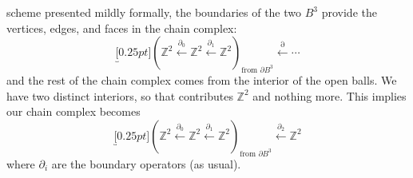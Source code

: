 scheme presented mildly formally, the boundaries of the two
$B^{3}$ provide the vertices, edges, and faces in the chain
complex:
\begin{equation}%
\underbracket[0.25pt]{\left(\mathbb{Z}^{2}\xleftarrow{\partial_{0}}\mathbb{Z}^{2}\xleftarrow{\partial_{1}}\mathbb{Z}^{2}\right)}_{\text{from $\partial{B^{3}}$}}\xleftarrow{\partial}\cdots
\end{equation}
and the rest of the chain complex comes from the interior of the
open balls. We have two distinct interiors, so that contributes
$\mathbb{Z}^{2}$ and nothing more. This implies our chain complex
becomes
\begin{equation}%
\underbracket[0.25pt]{\left(\mathbb{Z}^{2}\xleftarrow{\partial_{0}}\mathbb{Z}^{2}\xleftarrow{\partial_{1}}\mathbb{Z}^{2}\right)}_{\text{from $\partial{B^{3}}$}}\xleftarrow{\partial_{2}}\mathbb{Z}^{2}
\end{equation}
where $\partial_{i}$ are the boundary operators (as usual).
